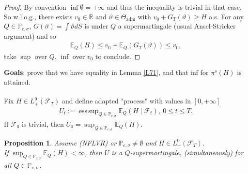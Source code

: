 \documentclass[12pt,a4paper, twoside]{article}
\newtheorem{prop}{Proposition}[section]
\theoremstyle{definition}
\newcommand{\EE}{\mathbb{E}} %
\newcommand{\PP}{\mathbb{P}} %
\DeclareMathOperator*{\esssup}{ess\,sup}
\begin{document}
\begin{proof}
By convention $\inf \emptyset = + \infty$ and thus the inequality is trivial in that case. So w.l.o.g., there exists $v_0 \in \mathbb{R}$ and $\vartheta \in \Theta_\text{adm}$ with $v_0 + G_T( \vartheta) \geq H$ a.s. For any $Q \in \PP_{e, \sigma}$, $G( \vartheta) = \int \vartheta dS$ is under $Q$ a supermartingale (usual Ansel-Stricker argument) and so 
\begin{align*}
\EE_Q(H) \leq v_0+ \EE_Q( G_T( \vartheta)) \leq v_0,
\end{align*}
take $\sup$ over $Q$, $\inf$ over $v_0$ to conclude. 
\end{proof}
\newpage
\noindent \textbf{Goals}: prove that we have equality in Lemma \ref{L71}, and that inf for $\pi^s(H)$ is attained. 
\\\\
Fix $H \in L_+^0( \mathcal{F}_T)$ and define adapted "process" with values in $[0, + \infty]$ 
\begin{align*}
U_t := \esssup_{Q \in \PP_{e ,\sigma}} \EE_Q(H \mid \mathcal{F}_t), \ 0 \leq t \leq T.
\end{align*}
If $\mathcal{F}_0$ is trivial, then $U_0 = \sup_{Q \in \PP_{e, \sigma}} \EE_Q(H).$
\begin{prop} \label{P72} Assume (NFLVR) or $\PP_{e, \sigma} \neq \emptyset$ and $H \in L_+^0( \mathcal{F}_T)$. \\ If $\sup_{Q \in \PP_{e, \sigma}} \EE_Q(H) < \infty$, then $U$ is a $Q$-supermartingale, (simultaneously) for all $Q \in \PP_{e, \sigma}$. 
\end{prop}
\end{document}
